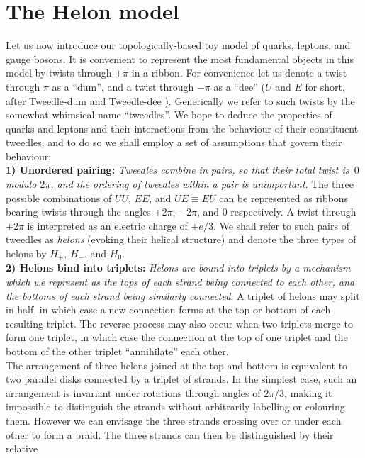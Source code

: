 \documentclass[twocolumn,showpacs,preprintnumbers,amsmath,amssymb]{revtex4}
\begin{document}
\section{The Helon model}
\label{sec:helons}
Let us now introduce our topologically-based toy model of quarks, leptons, and gauge bosons. 
It is convenient to represent the most fundamental objects in this model by twists 
through $\pm\pi$ in a ribbon. For convenience let us denote a twist through $\pi$ as a 
``dum'', and a twist through $-\pi$ as a ``dee'' ($U$ and $E$ for short, after 
Tweedle-dum and Tweedle-dee \cite{wonderland}). Generically we refer to such twists by 
the somewhat whimsical name ``tweedles''\cite{yesteryear}. We hope to deduce the 
properties of quarks and leptons and their interactions from the behaviour of 
their constituent tweedles, and to do so we shall employ a set of assumptions 
that govern their behaviour:\\
{\bf 1) Unordered pairing:} {\em Tweedles combine in pairs, so that their 
total twist is $\,0$ modulo $2\pi$, and the ordering of tweedles within a pair 
is unimportant}. The three possible combinations of $UU$, $EE$, and 
$UE \equiv EU$ can be represented as ribbons bearing twists through the 
angles $+2\pi$, $-2\pi$, and $0$ respectively. A twist through $\pm 2\pi$
is interpreted as an electric charge of $\pm e/3$. We shall refer to such pairs 
of tweedles as {\em helons} (evoking their helical structure) and denote the 
three types of helons by $H_+$, $H_-$, and $H_0$. \\ 
{\bf 2) Helons bind into triplets:} {\em Helons are bound into triplets by 
a mechanism which we represent as the tops of each strand being connected to each 
other, and the bottoms of each strand being similarly connected}. A triplet of 
helons may split in half, in which case a new connection forms at the top or bottom
of each resulting triplet. The reverse process may also occur when two triplets 
merge to form one triplet, in which case the connection at the top of one triplet 
and the bottom of the other triplet 
``annihilate'' each other. \\
The arrangement of three helons joined at the top and bottom is equivalent to two 
parallel disks connected by a triplet of strands. In the simplest case, such an 
arrangement is invariant under rotations through angles of $2\pi/3$, making it 
impossible to distinguish the strands without arbitrarily labelling or colouring 
them. However we can envisage the three strands crossing over or under each other 
to form a braid. The three strands can then be distinguished by their relative 
\end{document}
